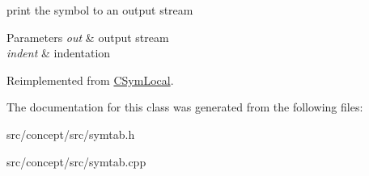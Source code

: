 print the symbol to an output stream 


\begin{DoxyParams}{Parameters}
{\em out} & output stream \\
\hline
{\em indent} & indentation \\
\hline
\end{DoxyParams}


Reimplemented from \hyperlink{classCSymLocal_a7f6989353e48305f8496e8a0f34a056e}{C\-Sym\-Local}.



The documentation for this class was generated from the following files\-:\begin{DoxyCompactItemize}
\item 
src/concept/src/symtab.\-h\item 
src/concept/src/symtab.\-cpp\end{DoxyCompactItemize}
